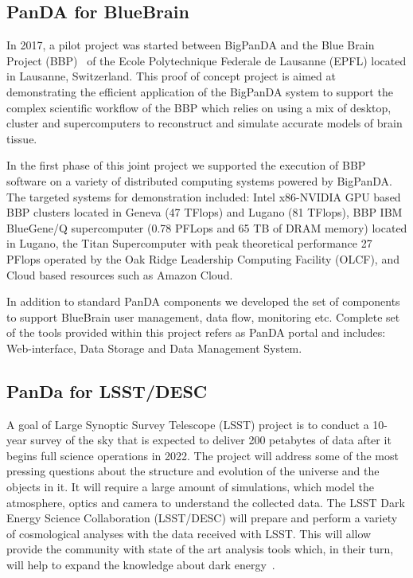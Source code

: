 \documentclass{webofc}
\begin{document}
\subsection{PanDA for BlueBrain}

In 2017, a pilot project was started between BigPanDA and the Blue Brain Project (BBP)~\cite{Markram:BBP} of the Ecole Polytechnique Federale de Lausanne (EPFL) located in Lausanne, Switzerland. This proof of concept project is aimed at demonstrating the efficient application of the BigPanDA system to support the complex scientific workflow of the BBP which relies on using a mix of desktop, cluster and supercomputers to reconstruct and simulate accurate models of brain tissue.

In the first phase of this joint project we supported the execution of BBP software on a variety of distributed computing systems powered by BigPanDA. The targeted systems for demonstration included: Intel x86-NVIDIA GPU based BBP clusters located in Geneva (47 TFlops) and Lugano (81 TFlops), BBP IBM BlueGene/Q supercomputer (0.78 PFLops and 65 TB of DRAM memory) located in Lugano, the Titan Supercomputer with peak theoretical performance 27 PFlops operated by the Oak Ridge Leadership Computing Facility (OLCF), and Cloud based resources such as Amazon Cloud.

In addition to standard PanDA components we developed the set of components to support BlueBrain user management, data flow, monitoring etc. Complete set of the tools provided within this project refers as PanDA portal and includes: Web-interface, Data Storage and Data Management System. 


\subsection{PanDa for LSST/DESC}

A goal of Large Synoptic Survey Telescope (LSST) project is to conduct a 10-year survey of the sky that is expected to deliver 200 petabytes of data after it begins full science operations in 2022. The project will address some of the most pressing questions about the structure and evolution of the universe and the objects in it. It will require a large amount of simulations, which model the atmosphere, optics and camera to understand the collected data. The LSST Dark Energy Science Collaboration (LSST/DESC) will prepare and perform a variety of cosmological analyses with the data received with LSST. This will allow provide the community with state of the art analysis tools which, in their turn, will help to expand the knowledge about dark energy~\cite{lsst-desc}.
\end{document}
